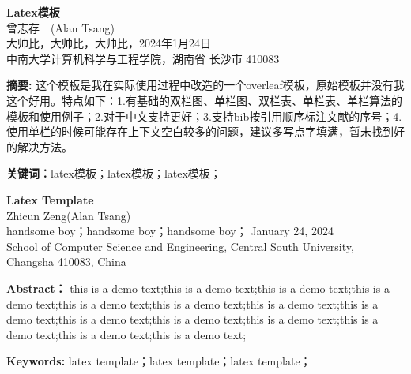 \documentclass{template} %
\newcommand{\name}{曾志存}
\newcommand{\stuid}{Alan Tsang}
\newcommand{\Name}{Zhicun Zeng} %
\newcommand{\newtitle}{Latex模板}
\begin{document}
\begin{center}
 \textbf{\newtitle}\\
 \kaishu \name \ \ (\stuid)\\
 \kaishu 大帅比，大帅比，大帅比，2024年1月24日\\中南大学计算机科学与工程学院，湖南省 长沙市 410083\\
\end{center}

\textbf{摘\quad 要:}
这个模板是我在实际使用过程中改造的一个overleaf模板，原始模板并没有我这个好用。特点如下：1.有基础的双栏图、单栏图、双栏表、单栏表、单栏算法的模板和使用例子；2.对于中文支持更好；3.支持bib按引用顺序标注文献的序号；4.使用单栏的时候可能存在上下文空白较多的问题，建议多写点字填满，暂未找到好的解决方法。

\textbf{关键词：}latex模板；latex模板；latex模板；
~\\

\begin{center}
	 \textbf{Latex Template}\\
	 \Name\quad (\stuid)\\
	 handsome boy；handsome boy；handsome boy； January 24, 2024 \\ School of Computer Science and Engineering, Central South University, Changsha 410083, China
\end{center}

\textbf{Abstract：}
this is a demo text;this is a demo text;this is a demo text;this is a demo text;this is a demo text;this is a demo text;this is a demo text;this is a demo text;this is a demo text;this is a demo text;this is a demo text;this is a demo text;this is a demo text;this is a demo text;

\textbf{Keywords: }latex template；latex template；latex template；
\end{document}
